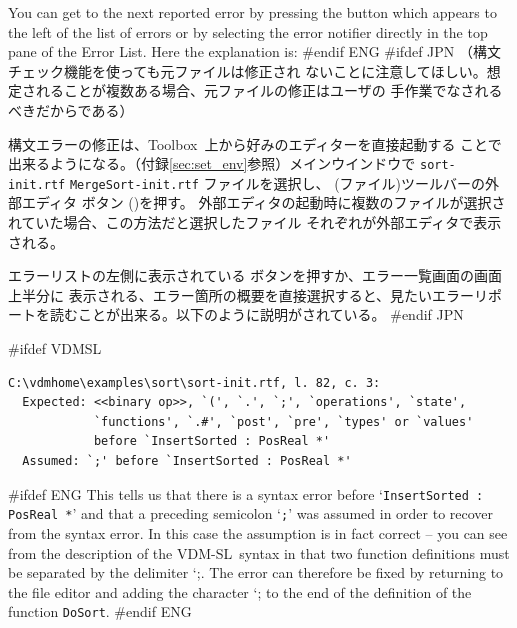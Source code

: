\documentclass[\pformat,12pt]{article}
\newcommand{\vdmslpp}{VDM-SL}
\newcommand{\Toolbox}{Toolbox}
\newcommand{\vdmhome}{vdmhome}
\newcommand{\vdmslpp}{VDM++}
\newcommand{\Toolbox}{Toolbox}
\newcommand{\vdmhome}{vpphome}
\newcommand{\Lit}[1]{`#1\Quote}
\newcommand{\aaa}{\tt }
\newcommand{\guicmd}[1]{{\sf #1}}
\newcommand{\guicmd}[1]{{\gt #1}}
\begin{document}
You can get to the next reported error by pressing the {\fbox{\tt >}}
button which appears to the left of the list of errors or by selecting the
error notifier directly in the top pane of the \guicmd{Error
  List}. Here the explanation is: 
#endif ENG
#ifdef JPN
（構文チェック機能を使っても元ファイルは修正され
ないことに注意してほしい。想定されることが複数ある場合、元ファイルの修正はユーザの
手作業でなされるべきだからである）

構文エラーの修正は、\Toolbox\ 上から好みのエディターを直接起動する
ことで出来るようになる。（付録\ref{sec:set_env}参照）メインウインドウで
{
{\tt sort-init.rtf}
}
{
{\tt MergeSort-init.rtf}
}
ファイルを選択し、
(\guicmd{ファイル})ツールバーの\guicmd{外部エディタ} ボタン
()を押す。
外部エディタの起動時に複数のファイルが選択されていた場合、この方法だと選択したファイル
それぞれが\guicmd{外部エディタ}で表示される。

エラーリストの左側に表示されている {\fbox{\tt >}}ボタンを押すか、\guicmd{エラー一覧}画面の画面上半分に
表示される、エラー箇所の概要を直接選択すると、見たいエラーリポートを読むことが出来る。以下のように説明がされている。
#endif JPN

#ifdef VDMSL
\begin{verbatim}
C:\vdmhome\examples\sort\sort-init.rtf, l. 82, c. 3:
  Expected: <<binary op>>, `(', `.', `;', `operations', `state',
            `functions', `.#', `post', `pre', `types' or `values' 
            before `InsertSorted : PosReal *'
  Assumed: `;' before `InsertSorted : PosReal *'
\end{verbatim}

#ifdef ENG
This tells us that there is a syntax error before `{\tt InsertSorted :
  PosReal *}' and that a preceding semicolon `{\tt ;}' was assumed in
  order to recover from the syntax error. In this case the assumption
  is in fact correct -- you can see from the  description of the
\vdmslpp\ syntax in \cite{UMLMan-CSK} that two function definitions must
  be separated by the delimiter \Lit{;}. The error can therefore be
  fixed by returning to the file editor and adding the character
  \Lit{;} to the end of the definition of the function {\aaa DoSort}.
#endif ENG
\end{document}
